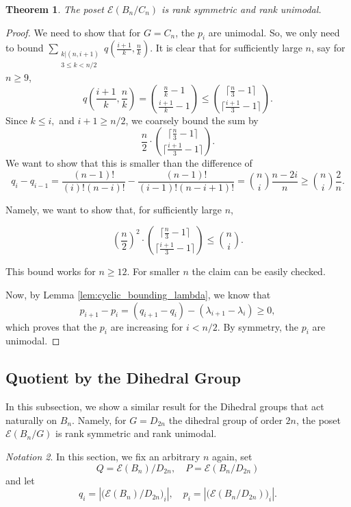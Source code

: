\documentclass[10 pt]{amsart}
\theoremstyle{plain}
\newtheorem{thm}{Theorem}[section]
\theoremstyle{definition}
\theoremstyle{remark}
\newtheorem{note}[thm]{Notation}
\numberwithin{equation}{section}
\newcommand\ssec{\subsection}
\newcommand{\dstyle}{\displaystyle}
\begin{document}
\begin{thm}{\label{cor:cyclic_unimodal}} 
The poset $\mathcal E(B_n/C_n)$ is rank symmetric and rank unimodal.
\end{thm}

\begin{proof}
We need to show that for $G= C_n$, the $p_i$ are unimodal. So, we only need to bound $ \dstyle \sum_{\substack{k | (n , i+1)\\ 3 \le k < n/2 }} q (\frac{i+1}{k}, \frac{n}{k}) $. It is clear that for sufficiently large $n$, say for $n \ge 9$, $$q\left(\frac{i+1}k, \frac n k\right) = {\frac n k - 1 \choose \frac{i+1} k -1} \le {\lceil \frac n 3-1 \rceil \choose \lceil \frac{i+1} 3 -1 \rceil }.$$ Since $k \leq i,$ and $ i+1 \ge n/2$, we coarsely bound the sum by $$\frac{n}{2} \cdot {\lceil \frac n 3-1 \rceil \choose \lceil \frac {i+1} 3 -1 \rceil }.$$
We want to show that this is smaller than the difference of $$q_i - q_{i-1} = \frac{(n-1)!}{(i)! (n-i)!} - \frac{(n-1)!}{(i-1)!(n-i+1)!}= {n \choose i } \frac{n-2i}{n} \ge  {n \choose i } \frac{2}{n} .$$

Namely, we want to show that, for sufficiently large $n$, 

$$ \left(\frac{n}{2}\right)^2 \cdot {\lceil \frac n 3-1 \rceil \choose \lceil \frac {i+1} 3 -1 \rceil }  \le   {n \choose i}.$$

This bound works for $n \ge 12$. For smaller $n$ the claim can be easily checked.

Now, by Lemma \ref{lem:cyclic_bounding_lambda}, we know that $$p_{i+1} - p_{i} =  (q_{i+1} - q_i) - (\lambda_{i+1}- \lambda_i) \ge 0,$$  which proves that the $p_i$ are increasing for $i < n/2$. By symmetry, the $p_i$ are unimodal.

\end{proof}








\ssec{Quotient by the Dihedral Group}
\label{ssec:dihedral}

In this subsection, we show a similar result for the Dihedral groups that act naturally on $B_n$. Namely, for $G = D_{2n}$ the dihedral group of order $2n$, the poset $\mathcal E(B_n/G)$ is rank symmetric and rank unimodal.


\begin{note} In this section, we fix an arbitrary $n$ again, set $$Q = \mathcal E (B_n)/D_{2n}, \quad P = \mathcal E(B_n/D_{2n})$$ and let $$q_i = |\big( \mathcal E (B_n)/D_{2n} \big)_i|, \quad p_i = |\big( \mathcal E(B_n/D_{2n}) \big)_i|. $$ 
\end{note}
\end{document}
